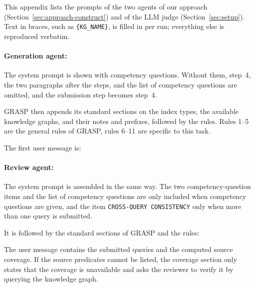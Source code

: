\section*{}\label{sec:appendix}


This appendix lists the prompts of the two agents of our approach (Section~\ref{sec:approach-construct}) and of the LLM judge (Section~\ref{sec:setup}). Text in braces, such as \texttt{\{KG\_NAME\}}, is filled in per run; everything else is reproduced verbatim.

\paragraph{Generation agent:}
The system prompt is shown with competency questions. Without them, step~4, the two paragraphs after the steps, and the list of competency questions are omitted, and the submission step becomes step~4.

GRASP then appends its standard sections on the index types, the available knowledge graphs, and their notes and prefixes, followed by the rules. Rules 1--5 are the general rules of GRASP, rules 6--11 are specific to this task.

The first user message is:


\paragraph{Review agent:}
The system prompt is assembled in the same way. The two competency-question items and the list of competency questions are only included when competency questions are given, and the item \texttt{CROSS-QUERY CONSISTENCY} only when more than one query is submitted.

It is followed by the standard sections of GRASP and the rules:

The user message contains the submitted queries and the computed source coverage. If the source predicates cannot be listed, the coverage section only states that the coverage is unavailable and asks the reviewer to verify it by querying the knowledge graph.


